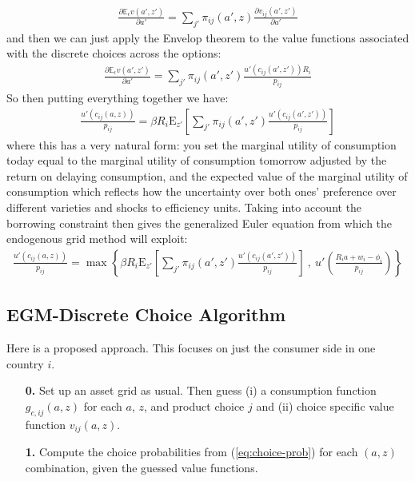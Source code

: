 \documentclass[12pt,pdftex]{article}
\begin{document}
\begin{onehalfspacing}
\begin{align}
\frac{\partial \mathbb{E}_{\epsilon} v(a', z')}{\partial a'} = \sum_{j'} \pi_{ij}(a', z) \frac{\partial v_{ij}(a', z')}{\partial a'}
\end{align}
and then we can just apply the Envelop theorem to the value functions associated with the discrete choices across the options:
\begin{align}
\frac{\partial \mathbb{E}_{\epsilon} v(a', z')}{\partial a'} = \sum_{j'} \pi_{ij}(a', z') \frac{u'(c_{ij}(a', z'))R_{i}}{p_{ij}}
\end{align}
So then putting everything together we have:
\begin{align}
\frac{u'(c_{ij}(a, z))}{p_{ij}} = \beta R_{i} \mathrm{E}_{z'} \left[ \sum_{j'} \pi_{ij}(a', z') \frac{u'(c_{ij}(a', z'))}{p_{ij}} \right]
\end{align}
where this has a very natural form: you set the marginal utility of consumption today equal to the marginal utility of consumption tomorrow adjusted by the return on delaying consumption, and the expected value of the marginal utility of consumption which reflects how the uncertainty over both ones' preference over different varieties and shocks to efficiency units. Taking into account the borrowing constraint then gives the generalized Euler equation from which the endogenous grid method will exploit:
\begin{align}
\frac{u'(c_{ij}(a, z))}{p_{ij}} = \max \left\{ \beta R_{i} \mathrm{E}_{z'} \left[ \sum_{j'} \pi_{ij}(a', z') \frac{u'(c_{ij}(a', z'))}{p_{ij}} \right] \ , \  u' \left( \frac{R_i a + w_i - \phi_{i}}{p_{ij}} \right) \right \}
\label{eq:apx-euler_equation}
\end{align}

\subsection{EGM-Discrete Choice Algorithm}

Here is a proposed approach. This focuses on just the consumer side in one country $i$.
\begin{itemize}
\item[\textbf{0.}] Set up an asset grid as usual. Then guess (i) a consumption function $g_{c,ij}(a,z)$ for each $a$, $z$, and product choice $j$ and (ii) choice specific value function $v_{ij}(a,z)$.

\item[\textbf{1.}] Compute the choice probabilities from (\ref{eq:choice-prob}) for each $(a,z)$ combination, given the guessed value functions.


\end{itemize}
\end{onehalfspacing}
\end{document}
